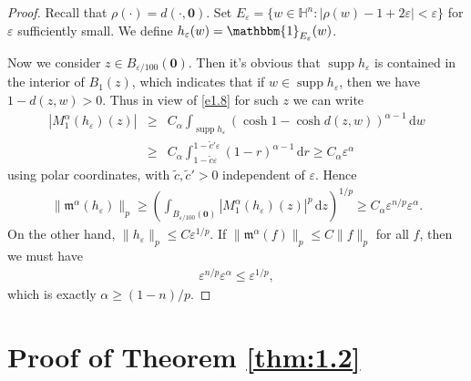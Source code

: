 \documentclass[11pt]{amsproc}
\newcommand{\indicator}{\mathbbm{1}}
\newcommand{\supp}{\mathop{\mathrm{supp}}}
\newcommand{\fm}{\mathfrak{m}}
\newcommand{\0}{\mathbf{0}}
\renewcommand{\H}{\mathbb{H}}
\renewcommand{\d}{\mathrm{d}}
\numberwithin{equation}{section}
\numberwithin{figure}{section}
\theoremstyle{definition}
\theoremstyle{remark}
\numberwithin{thm}{section}
\begin{document}
\begin{proof}
Recall that $\rho(\cdot)=d(\cdot,\0)$. Set $E_\varepsilon=\{w\in\H^n:|\rho(w)-1+2\varepsilon|<\varepsilon\}$ for $\varepsilon$ sufficiently small. We define $h_\varepsilon(w)=\indicator_{E_\varepsilon}(w)$.

Now we consider $z\in B_{\varepsilon/100}(\0)$. Then it's obvious that $\supp h_\varepsilon$ is contained in the interior of $B_1(z)$, which indicates that if $w\in \supp h_\varepsilon$, then we have $1-d(z,w)>0$. Thus in view of \eqref{e1.8} for such $z$ we can write
\begin{eqnarray*}
|M^\alpha_1(h_\varepsilon)(z)|&\geq &C_\alpha\int_{\supp h_\varepsilon}(\cosh 1-\cosh d(z,w))^{\alpha-1}\,\d w\\
&\geq &C_\alpha\int_{1-\widetilde{c}\varepsilon}^{1-\widetilde{c}'\varepsilon}(1-r)^{\alpha-1}\,\d r\geq C_\alpha\varepsilon^\alpha
\end{eqnarray*}
using polar coordinates, with $\widetilde{c},\widetilde{c}'>0$ independent of $\varepsilon$. Hence
\begin{eqnarray*}
\|\fm^\alpha(h_\varepsilon)\|_p\geq \left(\int_{B_{\varepsilon/100}(\0)}|M^\alpha_1(h_\varepsilon)(z)|^p\,\d z\right)^{1/p}\geq C_\alpha\varepsilon^{n/p}\varepsilon^\alpha.
\end{eqnarray*}
On the other hand, $\|h_\varepsilon\|_p\leq C\varepsilon^{1/p}$. If $\|\fm^\alpha(f)\|_p\leq C\|f\|_p$ for all $f$, then we must have
\begin{eqnarray*}
\varepsilon^{n/p}\varepsilon^\alpha\leq \varepsilon^{1/p},
\end{eqnarray*}
which is exactly $\alpha\geq(1-n)/p$.
\end{proof}



\medskip







\section{Proof of Theorem \ref{thm:1.2}}\label{sec:5}
\setcounter{equation}{0}
\end{document}
